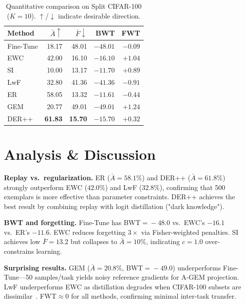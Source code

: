 \documentclass[10pt, a4paper, twocolumn]{article}
\begin{document}
\begin{table}[H]
\centering
\caption{Quantitative comparison on Split CIFAR-100 ($K\!=\!10$). $\uparrow$/$\downarrow$ indicate desirable direction.}
\vspace{2pt}
\small
\begin{tabular}{l r r r r}
\toprule
\textbf{Method} & $\bar{A}\!\uparrow$ & $\bar{F}\!\downarrow$ & \textbf{BWT} & \textbf{FWT} \\
\midrule
Fine-Tune & 18.17 & 48.01 & $-48.01$ & $-0.09$ \\
EWC       & 42.00 & 16.10 & $-16.10$ & $+1.04$ \\
SI        & 10.00 & 13.17 & $-11.70$ & $+0.89$ \\
LwF       & 32.80 & 41.36 & $-41.36$ & $-0.91$ \\
ER        & 58.05 & 13.32 & $-11.61$ & $-0.44$ \\
GEM       & 20.77 & 49.01 & $-49.01$ & $+1.24$ \\
DER++     & \textbf{61.83} & \textbf{15.70} & $-15.70$ & $+0.32$ \\
\bottomrule
\end{tabular}
\label{tab:results}
\end{table}

\section{Analysis \& Discussion}

\textbf{Replay vs.\ regularization.}
ER ($\bar{A}\!=\!58.1\%$) and DER++ ($\bar{A}\!=\!61.8\%$) strongly outperform EWC ($42.0\%$) and LwF ($32.8\%$), confirming that 500 exemplars is more effective than parameter constraints. DER++ achieves the best result by combining replay with logit distillation ("dark knowledge").

\textbf{BWT and forgetting.}
Fine-Tune has BWT$\!=\!-48.0$ vs.\ EWC's $-16.1$ vs.\ ER's $-11.6$. EWC reduces forgetting $3\times$ via Fisher-weighted penalties. SI achieves low $\bar{F}\!=\!13.2$ but collapses to $\bar{A}\!=\!10\%$, indicating $c\!=\!1.0$ over-constrains learning.

\textbf{Surprising results.}
GEM ($\bar{A}\!=\!20.8\%$, BWT$\!=\!-49.0$) underperforms Fine-Tune---50 samples/task yields noisy reference gradients for A-GEM projection. LwF underperforms EWC as distillation degrades when CIFAR-100 subsets are dissimilar~\cite{li2016learning}. FWT$\approx 0$ for all methods, confirming minimal inter-task transfer.
\end{document}

